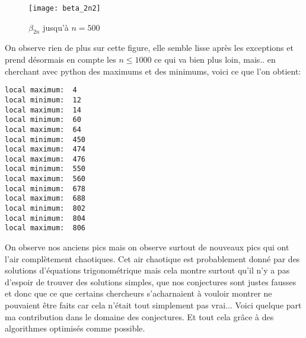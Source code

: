 \begin{figure}[h!]
  \centering
  \texttt{[image: beta\_2n2]}
  \caption{$\beta_{2n}$ jusqu'à $n = 500$}
  \label{fig:beta2n2}
\end{figure}

On observe rien de plus sur cette figure, elle semble lisse après les exceptions et prend désormais en compte les $n \leq 1000$ ce qui va bien plus loin, mais.. en cherchant avec python des maximums et des minimums, voici ce que l'on obtient:

\begin{verbatim}
local maximum:  4
local minimum:  12
local maximum:  14
local minimum:  60
local maximum:  64
local minimum:  450
local maximum:  474
local maximum:  476
local minimum:  550
local maximum:  560
local minimum:  678
local maximum:  688
local minimum:  802
local minimum:  804
local maximum:  806
\end{verbatim}

On observe nos anciens pics mais on observe surtout de nouveaux pics qui ont l'air complètement chaotiques. Cet air chaotique est probablement donné par des solutions d'équations trigonométrique mais cela montre surtout qu'il n'y a pas d'espoir de trouver des solutions simples, que nos conjectures sont justes fausses et donc que ce que certains chercheurs s'acharnaient à vouloir montrer ne pouvaient être faits car cela n'était tout simplement pas vrai... Voici quelque part ma contribution dans le domaine des conjectures. Et tout cela grâce à des algorithmes optimisés comme possible.